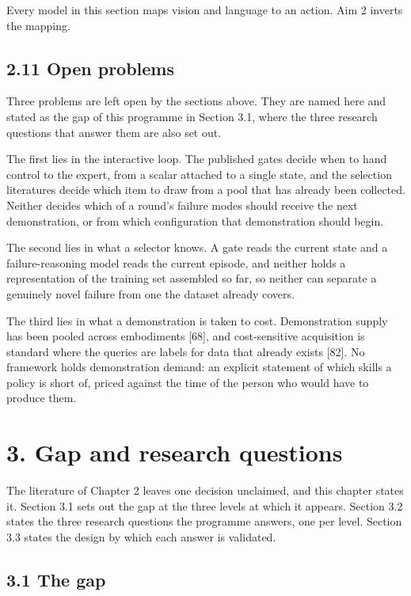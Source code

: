 \documentclass[
  11pt,
]{article}
\begin{document}
Every model in this section maps vision and language to an action. Aim 2
inverts the mapping.

\hypertarget{open-problems}{%
\subsection{2.11 Open problems}\label{open-problems}}

Three problems are left open by the sections above. They are named here
and stated as the gap of this programme in Section 3.1, where the three
research questions that answer them are also set out.

The first lies in the interactive loop. The published gates decide when
to hand control to the expert, from a scalar attached to a single state,
and the selection literatures decide which item to draw from a pool that
has already been collected. Neither decides which of a round's failure
modes should receive the next demonstration, or from which configuration
that demonstration should begin.

The second lies in what a selector knows. A gate reads the current state
and a failure-reasoning model reads the current episode, and neither
holds a representation of the training set assembled so far, so neither
can separate a genuinely novel failure from one the dataset already
covers.

The third lies in what a demonstration is taken to cost. Demonstration
supply has been pooled across embodiments {[}68{]}, and cost-sensitive
acquisition is standard where the queries are labels for data that
already exists {[}82{]}. No framework holds demonstration demand: an
explicit statement of which skills a policy is short of, priced against
the time of the person who would have to produce them.

\hypertarget{gap-and-research-questions}{%
\section{3. Gap and research
questions}\label{gap-and-research-questions}}

The literature of Chapter 2 leaves one decision unclaimed, and this
chapter states it. Section 3.1 sets out the gap at the three levels at
which it appears. Section 3.2 states the three research questions the
programme answers, one per level. Section 3.3 states the design by which
each answer is validated.

\hypertarget{the-gap}{%
\subsection{3.1 The gap}\label{the-gap}}
\end{document}
